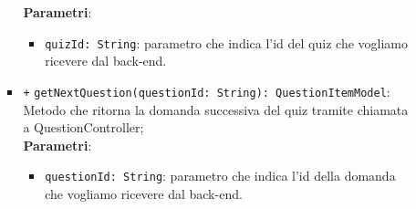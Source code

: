 \begin{itemize}
\begin{itemize}
\begin{itemize}
		\textbf{Parametri}:
		\begin{itemize}
			\item \texttt{quizId: String}: parametro che indica l'id del quiz che vogliamo ricevere dal back-end.
		\end{itemize}
		\item \texttt{+} \texttt{getNextQuestion(questionId: String): QuestionItemModel}: \\ Metodo che ritorna la domanda successiva del quiz tramite chiamata a QuestionController; \\
		\textbf{Parametri}:
		\begin{itemize}
			\item \texttt{questionId: String}: parametro che indica l'id della domanda che vogliamo ricevere dal back-end.
		\end{itemize}
	\end{itemize}
\end{itemize}


\end{itemize}
